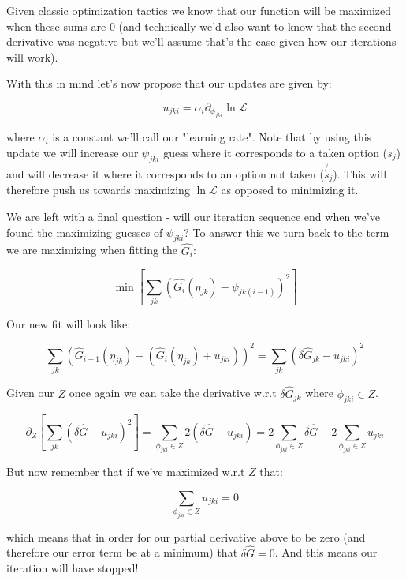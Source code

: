 \documentclass[11pt]{article}
\begin{document}
Given classic optimization tactics we know that our function will be maximized when these sums are $0$ (and technically we'd also want to know that the second derivative was negative but we'll assume that's the case given how our iterations will work). \newline

With this in mind let's now propose that our updates are given by:

$$u_{jki} = \alpha_i \partial_{\phi_{jki}} \ln{\mathcal{L}} $$

where $\alpha_i$ is a constant we'll call our "learning rate". Note that by using this update we will increase our $\psi_{jki}$ guess where it corresponds to a taken option ($s_j$) and will decrease it where it corresponds to an option not taken ($\not{s_j}$). This will therefore push us towards maximizing $\ln{\mathcal{L}}$ as opposed to minimizing it. \newline

We are left with a final question - will our iteration sequence end when we've found the maximizing guesses of $\psi_{jki}$? To answer this we turn back to the term we are maximizing when fitting the $\hat{G_i}$: 

$$\min{\left[ \sum_{jk}\left(\hat{G_i}(\eta_{jk}) - \psi_{jk(i-1)}\right)^2 \right]}$$

Our new fit will look like:

$$\sum_{jk}\left(\hat{G}_{i+1}(\eta_{jk}) - (\hat{G}_i(\eta_{jk}) + u_{jki})\right)^2=\sum_{jk}\left( \delta \hat{G}_{jk} - u_{jki}\right)^2$$

Given our $Z$ once again we can take the derivative w.r.t $\delta \hat{G}_{jk}$ where $\phi_{jki} \in Z$. 

$$\partial_Z \left[ \sum_{jk}\left( \delta \hat{G} - u_{jki}\right)^2 \right] = \sum_{\phi_{jki} \in Z} 2\left( \delta \hat{G} - u_{jki}\right) = 2\sum_{\phi_{jki} \in Z} \delta \hat{G} - 2\sum_{\phi_{jki} \in Z} u_{jki}$$

But now remember that if we've maximized w.r.t $Z$ that:

$$\sum_{\phi_{jki} \in Z} u_{jki} = 0$$

which means that in order for our partial derivative above to be zero (and therefore our error term be at a minimum) that $\delta \hat{G}=0$. And this means our iteration will have stopped! 

\newpage
\end{document}
